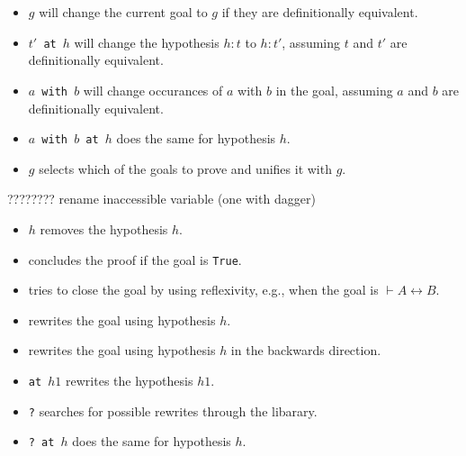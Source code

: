 \documentclass[a4paper]{article}
\newcommand{\True}{\texttt{True}}
\begin{document}

\begin{itemize}
    \item \texttt{\change $g$} will change the current goal to $g$ if they are definitionally equivalent.
    \item \texttt{\change $t'$ at $h$} will change the hypothesis $h:t$ to $h:t'$, assuming $t$ and $t'$ are definitionally equivalent.
    \item \texttt{\change $a$ with $b$} will change occurances of $a$ with $b$ in the goal, assuming $a$ and $b$ are definitionally equivalent.
    \item \texttt{\change $a$ with $b$ at $h$} does the same for hypothesis $h$.
\end{itemize}


\begin{itemize}
    \item \texttt{\sshow $g$} selects which of the goals to prove and unifies it with $g$.
\end{itemize}

 ???????? rename inaccessible variable (one with dagger)


\begin{itemize}
    \item \texttt{\clear $h$} removes the hypothesis $h$.
\end{itemize}


\begin{itemize}
    \item \texttt{\triv} concludes the proof if the goal is \True.
\end{itemize}


\begin{itemize}
    \item \texttt{\rfl} tries to close the goal by using reflexivity, e.g., when the goal is $\vdash A \leftrightarrow B$.
\end{itemize}


\begin{itemize}
    \item \texttt{\rw [$h$]} rewrites the goal using hypothesis $h$.
    \item \texttt{\rw [$\gets h$]} rewrites the goal using hypothesis $h$ in the backwards direction.
    \item \texttt{\rw [$h$] at $h1$} rewrites the hypothesis $h1$.
    \item \texttt{\rw?} searches for possible rewrites through the libarary.
    \item \texttt{\rw?\ at $h$} does the same for hypothesis $h$.
\end{itemize}
\end{document}
